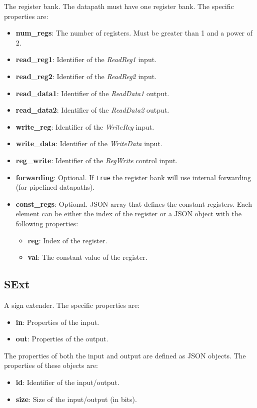 \documentclass[11pt,a4paper,twoside,titlepage]{report}
\begin{document}
The register bank. The datapath must have one register bank.
The specific properties are:
\begin{itemize}
	\item \textbf{num\_regs}: The number of registers. Must be greater than 1 and
		a power of 2.
	\item \textbf{read\_reg1}: Identifier of the \textit{ReadReg1} input.
	\item \textbf{read\_reg2}: Identifier of the \textit{ReadReg2} input.
	\item \textbf{read\_data1}: Identifier of the \textit{ReadData1} output.
	\item \textbf{read\_data2}: Identifier of the \textit{ReadData2} output.
	\item \textbf{write\_reg}: Identifier of the \textit{WriteReg} input.
	\item \textbf{write\_data}: Identifier of the \textit{WriteData} input.
	\item \textbf{reg\_write}: Identifier of the \textit{RegWrite} control input.
	\item \textbf{forwarding}: Optional. If \verb+true+ the register bank will use 
		internal forwarding (for pipelined datapaths).
	\item \textbf{const\_regs}: Optional. JSON array that defines the constant 
		registers. Each element can be either the index of the register or a JSON 
		object with the following properties:
		\begin{itemize}
			\item \textbf{reg}: Index of the register.
			\item \textbf{val}: The constant value of the register.
		\end{itemize}
\end{itemize}

\subsection{SExt}

A sign extender. The specific properties are:
\begin{itemize}
	\item \textbf{in}: Properties of the input.
	\item \textbf{out}: Properties of the output.
\end{itemize}

The properties of both the input and output are defined as JSON objects. 
The properties of these objects are:
\begin{itemize}
	\item \textbf{id}: Identifier of the input/output.
	\item \textbf{size}: Size of the input/output (in bits).
\end{itemize}
\end{document}
